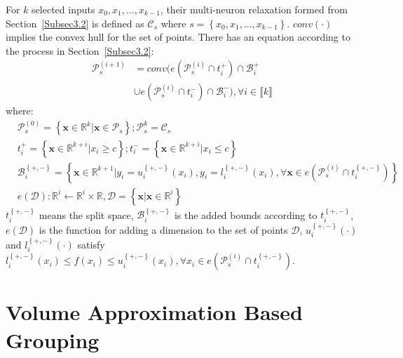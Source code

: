 \documentclass[runningheads]{llncs}
\newcommand{\myvec}[1]{\boldsymbol{#1}}
\begin{document}
\begin{definition}\label{Def3}
For $k$ selected inputs $x_{0},x_{1},...,x_{k-1}$, their multi-neuron relaxation formed from Section~\ref{Subsec3.2} is defined as
$\mathcal{C}_{s}$ where $s = \left \{x_{0},x_{1},...,x_{k-1}\right \}$. 
$conv(\cdot)$ implies the convex hull for the set of points. 
There has an equation according to the process in Section~\ref{Subsec3.2}:
\begin{equation}\label{C}
\begin{aligned}
\mathcal{P}_{s}^{(i+1)} &= conv( e(\mathcal{P}^{(i)}_{s} \cap t_{i}^{+} ) \cap \mathcal{B}_{i}^{+}\\ 
&\cup e(\mathcal{P}^{(i)}_{s} \cap t_{i}^{-} ) \cap \mathcal{B}_{i}^{-}), \forall i \in \llbracket  k \rrbracket
\end{aligned}
\end{equation}
where:
\begin{equation*}
\begin{aligned}
&\mathcal{P}_{s}^{(0)} = \left\{ \myvec{x} \in \mathbb{R}^{k}|\myvec{x} \in \mathcal{P}_{s} \right\};\mathcal{P}_{s}^{k}=\mathcal{C}_{s}\\
&t_{i}^{+} = \left\{ \myvec{x} \in \mathbb{R}^{k+i}|x_{i} \geq c \right\};t_{i}^{-} = \left\{ \myvec{x} \in \mathbb{R}^{k+i}|x_{i} \leq c \right\}\\
&\mathcal{B}_{i}^{\left\{+,-\right\}} = \left\{ \myvec{x} \in \mathbb{R}^{k+1} | y_{i}=u^{\left\{+,-\right\}}_{i}(x_{i}),y_{i}=l^{\left\{+,-\right\}}_{i}(x_{i}),\forall \myvec{x} \in e(\mathcal{P}^{(i)}_{s} \cap t_{i}^{\left\{+,-\right\}}) \right\} \\
&e(\mathcal{D}):\mathbb{R}^{i} \leftarrow \mathbb{R}^{i}\times \mathbb{R}, \mathcal{D} = \left\{ \myvec{x}|\myvec{x}\in \mathbb{R}^{i} \right\}
\end{aligned}
\end{equation*}
$t_{i}^{\left\{+,- \right\}}$ means the split space, $\mathcal{B}_{i}^{\left\{+,- \right\}}$ is the added bounds according to $t_{i}^{\left\{+,- \right\}}$, $e(\mathcal{D})$ is the function for adding a dimension to the  set of points $\mathcal{D}$, $u^{\left\{+,-\right\}}_{i}(\cdot)$ and $l^{\left\{+,-\right\}}_{i}(\cdot)$ satisfy $l^{\left\{+,- \right\}}_{i}(x_{i}) \leq f(x_{i}) \leq u^{\left\{+,- \right\}}_{i}(x_{i}), \forall x_{i} \in e(\mathcal{P}^{(i)}_{s} \cap t_{i}^{\left\{+,-\right\}})$. 
\end{definition}

%
%
%

\section{Volume Approximation Based Grouping}\label{Sec3}
\label{sec:method}
\end{document}

